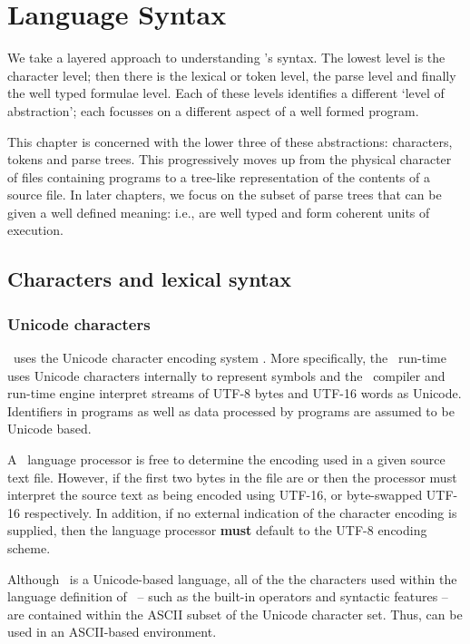 \chapter{Language Syntax}
\label{grammar}
We take a layered approach to understanding \go's syntax. The lowest level is the character level; then there is the lexical or token level, the parse level and finally the well typed formulae level. Each of these levels identifies a different `level of abstraction'; each focusses on a different aspect of a well formed \go program.

This chapter is concerned with the lower three of these abstractions: characters, tokens and parse trees. This progressively moves up from the physical character of files containing \go programs to a tree-like representation of the contents of a \go source file. In later chapters, we focus on the subset of parse trees that can be given a well defined meaning: i.e., are well typed and form coherent units of execution.

\section{Characters and lexical syntax}
\subsection{Unicode characters}

\go\ uses the Unicode character encoding system \cite{unicode:30}. More specifically, the \go\ run-time uses Unicode characters internally to represent symbols and the \go\ compiler and run-time engine interpret streams of UTF-8 bytes and UTF-16 words as Unicode. Identifiers in \go programs as well as data processed by \go programs are assumed to be Unicode based.

A \go\ language processor is free to determine the encoding used in a given source text file. However, if the first two bytes in the file are  or  then the processor must interpret the source text as being encoded using UTF-16, or byte-swapped UTF-16 respectively. In addition, if no external indication of the character encoding is supplied, then the language processor \textbf{must} default to the UTF-8 encoding scheme.
    
Although \go\ is a Unicode-based language, all of the the characters used within the language definition of \go\ -- such as the built-in operators and syntactic features -- are contained within the ASCII subset of the Unicode character set. Thus, \go can be used in an ASCII-based environment.

